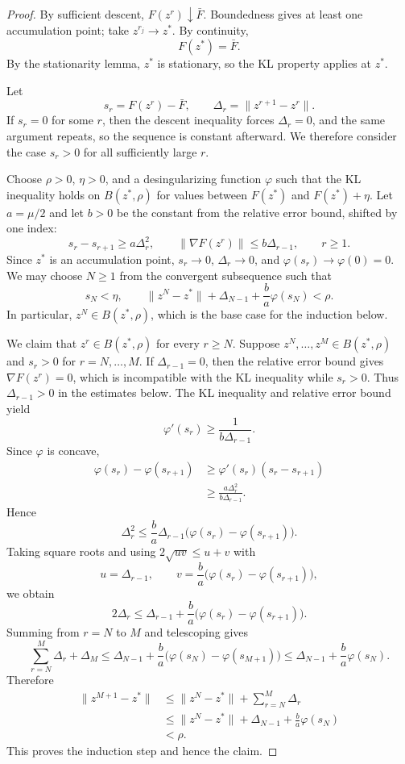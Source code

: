 \documentclass[11pt]{article}
\begin{document}
\begin{proof}
By sufficient descent, \(F(z^r)\downarrow \bar F\).  Boundedness gives at least one accumulation point; take \(z^{r_j}\to z^*\).  By continuity,
\[
    F(z^*)=\bar F.
\]
By the stationarity lemma, \(z^*\) is stationary, so the KL property applies at \(z^*\).

Let
\[
    s_r=F(z^r)-\bar F,
    \qquad
    \Delta_r=\|z^{r+1}-z^r\|.
\]
If \(s_r=0\) for some \(r\), then the descent inequality forces \(\Delta_r=0\), and the same argument repeats, so the sequence is constant afterward.  We therefore consider the case \(s_r>0\) for all sufficiently large \(r\).

Choose \(\rho>0\), \(\eta>0\), and a desingularizing function \(\varphi\) such that the KL inequality holds on \(B(z^*,\rho)\) for values between \(F(z^*)\) and \(F(z^*)+\eta\).  Let \(a=\mu/2\) and let \(b>0\) be the constant from the relative error bound, shifted by one index:
\[
    s_r-s_{r+1}\ge a\Delta_r^2,
    \qquad
    \|\nabla F(z^r)\|\le b\Delta_{r-1},
    \qquad r\ge1.
\]
Since \(z^*\) is an accumulation point, \(s_r\to0\), \(\Delta_r\to0\), and \(\varphi(s_r)\to\varphi(0)=0\).  We may choose \(N\ge1\) from the convergent subsequence such that
\[
    s_N<\eta,
    \qquad
    \|z^N-z^*\|+\Delta_{N-1}+\frac{b}{a}\varphi(s_N)<\rho.
\]
In particular, \(z^N\in B(z^*,\rho)\), which is the base case for the induction below.

We claim that \(z^r\in B(z^*,\rho)\) for every \(r\ge N\).  Suppose \(z^N,\ldots,z^M\in B(z^*,\rho)\) and \(s_r>0\) for \(r=N,\ldots,M\).  If \(\Delta_{r-1}=0\), then the relative error bound gives \(\nabla F(z^r)=0\), which is incompatible with the KL inequality while \(s_r>0\).  Thus \(\Delta_{r-1}>0\) in the estimates below.  The KL inequality and relative error bound yield
\[
    \varphi'(s_r)
    \ge
    \frac{1}{b\Delta_{r-1}}.
\]
Since \(\varphi\) is concave,
\[
\begin{aligned}
    \varphi(s_r)-\varphi(s_{r+1})
    &\ge
    \varphi'(s_r)(s_r-s_{r+1}) \\
    &\ge
    \frac{a\Delta_r^2}{b\Delta_{r-1}}.
\end{aligned}
\]
Hence
\[
    \Delta_r^2
    \le
    \frac{b}{a}\Delta_{r-1}
    \bigl(\varphi(s_r)-\varphi(s_{r+1})\bigr).
\]
Taking square roots and using \(2\sqrt{uv}\le u+v\) with
\[
    u=\Delta_{r-1},
    \qquad
    v=\frac{b}{a}\bigl(\varphi(s_r)-\varphi(s_{r+1})\bigr),
\]
we obtain
\[
    2\Delta_r
    \le
    \Delta_{r-1}
    +
    \frac{b}{a}\bigl(\varphi(s_r)-\varphi(s_{r+1})\bigr).
\]
Summing from \(r=N\) to \(M\) and telescoping gives
\[
    \sum_{r=N}^{M}\Delta_r+\Delta_M
    \le
    \Delta_{N-1}
    +
    \frac{b}{a}
    \bigl(\varphi(s_N)-\varphi(s_{M+1})\bigr)
    \le
    \Delta_{N-1}+\frac{b}{a}\varphi(s_N).
\]
Therefore
\[
\begin{aligned}
    \|z^{M+1}-z^*\|
    &\le
    \|z^N-z^*\|+\sum_{r=N}^{M}\Delta_r \\
    &\le
    \|z^N-z^*\|+\Delta_{N-1}+\frac{b}{a}\varphi(s_N) \\
    &<\rho.
\end{aligned}
\]
This proves the induction step and hence the claim.


\end{proof}
\end{document}
